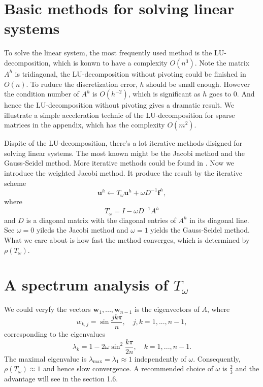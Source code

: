 \documentclass{SBCbookchapter}
\begin{document}
\section{Basic methods for solving linear systems}

\par To solve the linear system, the most frequently used method is the LU-decomposition, which is konwn to have a complexity $O(n^3)$. Note the matrix $A^h$ is tridiagonal, the LU-decomposition without pivoting could be finished in $O(n)$. To ruduce the discretization error, $h$ should be small enough. However the condition number of $A^h$ is $O(h^{-2})$, which is significant as $h$ goes to $0$. And hence the LU-decomposition without pivoting gives a dramatic result. We illustrate a simple acceleration technic of the LU-decomposition for sparse matrices in the appendix, which has the complexity $O(m^2)$.

Dispite of the LU-decomposition, there's a lot iterative methods disigned for solving linear systems. The most known might be the Jacobi method and the Gauss-Seidel method. More iterative methods could be found in \cite{YousefIter}. Now we introduce the weighted Jacobi method. It produce the result by the iterative scheme
\begin{equation}
	\mathbf{u}^h\gets T_\omega \mathbf{u}^h+\omega D^{-1} \mathbf{f}^h,
\end{equation}
where
\begin{equation}
	T_\omega=I-\omega D^{-1}A^h
\end{equation}
and $D$ is a diagonal matrix with the diagonal entries of $A^h$ in its diagonal line. See $\omega=0$ yileds the Jacobi method and $\omega=1$ yields the Gauss-Seidel method. What we care about is how fast the method converges, which is determined by $\rho(T_\omega)$.

\section{A spectrum analysis of $T_\omega$}

We could veryfy the vectors $\mathbf{w}_1,...,\mathbf{w}_{n-1}$ is the eigenvectors of $A$, where
\begin{equation}
	w_{k,j}=\sin\frac{jk\pi}{n},\quad j,k=1,...,n-1,
\end{equation}
corresponding to the eigenvalues
\begin{equation}
	\lambda_k=1-2\omega\sin^2\frac{k\pi}{2n},\quad k=1,...,n-1.
\end{equation}
The maximal eigenvalue is $\lambda_\text{max}=\lambda_1\approx 1$ independently of $\omega$. Consequently, $\rho(T_\omega)\approx 1$ and hence slow convergence. A recommended choice of $\omega$ is $\frac{2}{3}$ and the advantage will see in the section 1.6.
\end{document}
